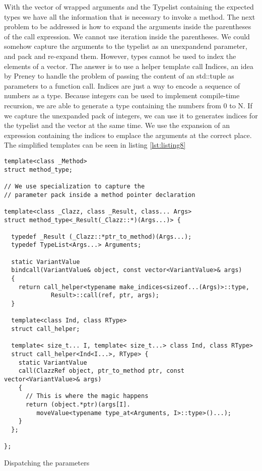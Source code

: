 With the vector of wrapped arguments and the Typelist containing the expected types we have all the information that is necessary to
invoke a method. The next problem to be addressed is how to expand the arguments inside the parentheses of the call expression.
We cannot use iteration inside the parentheses. We could somehow capture the arguments to the typelist as an unexpandend parameter,
and pack and re-expand them. However, types cannot be used to index the elements of a vector. The answer is to use a helper template
call Indices, an idea by Preney\cite{Preney} to handle the problem of passing the content of an std::tuple as parameters to a function
call. Indices are just a way to encode a sequence of numbers as a type. Because integers can be used to implement compile-time recursion,
we are able to generate a type containing the numbers from 0 to N. If we capture the unexpanded pack of integers, we can use it to
generates indices for the typelist and the vector at the same time. We use the expansion of an expression containing the indices to
emplace the arguments at the correct place. The simplified templates can be seen in listing \ref{lst:listing8}

\begin{listing}[H]
\begin{verbatim}
template<class _Method>
struct method_type;

// We use specialization to capture the
// parameter pack inside a method pointer declaration

template<class _Clazz, class _Result, class... Args>
struct method_type<_Result(_Clazz::*)(Args...)> {
  
  typedef _Result (_Clazz::*ptr_to_method)(Args...);
  typedef TypeList<Args...> Arguments;

  static VariantValue
  bindcall(VariantValue& object, const vector<VariantValue>& args)
  {
    return call_helper<typename make_indices<sizeof...(Args)>::type,
             Result>::call(ref, ptr, args);
  }

  template<class Ind, class RType>
  struct call_helper;

  template< size_t... I, template< size_t...> class Ind, class RType>
  struct call_helper<Ind<I...>, RType> {
    static VariantValue
    call(ClazzRef object, ptr_to_method ptr, const vector<VariantValue>& args)
    {
      // This is where the magic happens
      return (object.*ptr)(args[I].
         moveValue<typename type_at<Arguments, I>::type>()...);
    }
  };

};
\end{verbatim}
\caption{Dispatching the parameters}
\label{lst:listing8}
\end{listing}

